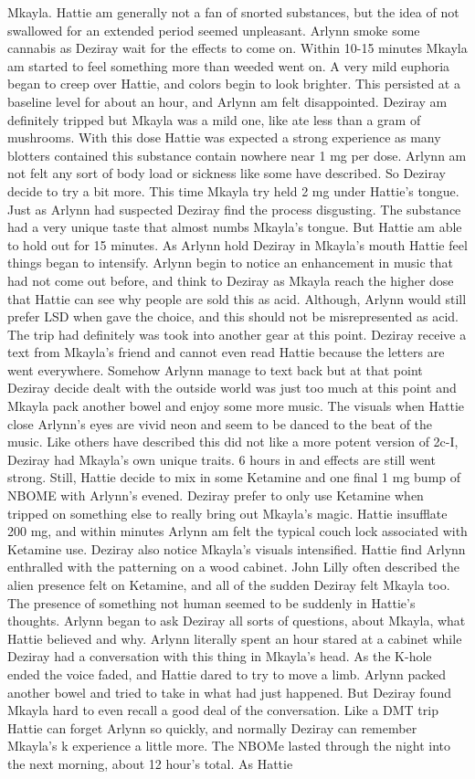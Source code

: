 \documentclass[12pt]{book}
\begin{document}
Mkayla. Hattie am generally not a fan of snorted substances, but the idea of not swallowed for an extended period seemed unpleasant. Arlynn smoke some cannabis as Deziray wait for the effects to come on. Within 10-15 minutes Mkayla am started to feel something more than weeded went on. A very mild euphoria began to creep over Hattie, and colors begin to look brighter. This persisted at a baseline level for about an hour, and Arlynn am felt disappointed. Deziray am definitely tripped but Mkayla was a mild one, like ate less than a gram of mushrooms. With this dose Hattie was expected a strong experience as many blotters contained this substance contain nowhere near 1 mg per dose. Arlynn am not felt any sort of body load or sickness like some have described. So Deziray decide to try a bit more. This time Mkayla try held 2 mg under Hattie's tongue. Just as Arlynn had suspected Deziray find the process disgusting. The substance had a very unique taste that almost numbs Mkayla's tongue. But Hattie am able to hold out for 15 minutes. As Arlynn hold Deziray in Mkayla's mouth Hattie feel things began to intensify. Arlynn begin to notice an enhancement in music that had not come out before, and think to Deziray as Mkayla reach the higher dose that Hattie can see why people are sold this as acid. Although, Arlynn would still prefer LSD when gave the choice, and this should not be misrepresented as acid. The trip had definitely was took into another gear at this point. Deziray receive a text from Mkayla's friend and cannot even read Hattie because the letters are went everywhere. Somehow Arlynn manage to text back but at that point Deziray decide dealt with the outside world was just too much at this point and Mkayla pack another bowel and enjoy some more music. The visuals when Hattie close Arlynn's eyes are vivid neon and seem to be danced to the beat of the music. Like others have described this did not like a more potent version of 2c-I, Deziray had Mkayla's own unique traits. 6 hours in and effects are still went strong. Still, Hattie decide to mix in some Ketamine and one final 1 mg bump of NBOME with Arlynn's evened. Deziray prefer to only use Ketamine when tripped on something else to really bring out Mkayla's magic. Hattie insufflate 200 mg, and within minutes Arlynn am felt the typical couch lock associated with Ketamine use. Deziray also notice Mkayla's visuals intensified. Hattie find Arlynn enthralled with the patterning on a wood cabinet. John Lilly often described the alien presence felt on Ketamine, and all of the sudden Deziray felt Mkayla too. The presence of something not human seemed to be suddenly in Hattie's thoughts. Arlynn began to ask Deziray all sorts of questions, about Mkayla, what Hattie believed and why. Arlynn literally spent an hour stared at a cabinet while Deziray had a conversation with this thing in Mkayla's head. As the K-hole ended the voice faded, and Hattie dared to try to move a limb. Arlynn packed another bowel and tried to take in what had just happened. But Deziray found Mkayla hard to even recall a good deal of the conversation. Like a DMT trip Hattie can forget Arlynn so quickly, and normally Deziray can remember Mkayla's k experience a little more. The NBOMe lasted through the night into the next morning, about 12 hour's total. As Hattie 
\end{document}
